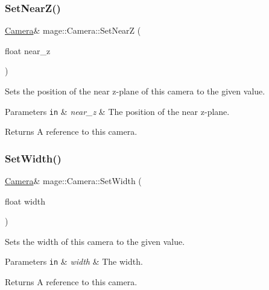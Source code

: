 \subsubsection{\texorpdfstring{Set\+Near\+Z()}{SetNearZ()}}
{\footnotesize\ttfamily \hyperlink{classmage_1_1_camera}{Camera}\& mage\+::\+Camera\+::\+Set\+NearZ (\begin{DoxyParamCaption}\item[{float}]{near\+\_\+z }\end{DoxyParamCaption})}

Sets the position of the near z-\/plane of this camera to the given value.


\begin{DoxyParams}[1]{Parameters}
\mbox{\tt in}  & {\em near\+\_\+z} & The position of the near z-\/plane. \\
\hline
\end{DoxyParams}
\begin{DoxyReturn}{Returns}
A reference to this camera. 
\end{DoxyReturn}
\hypertarget{classmage_1_1_camera_acddfb1108ee8f7e937833286c082dadf}{}\label{classmage_1_1_camera_acddfb1108ee8f7e937833286c082dadf} 
\subsubsection{\texorpdfstring{Set\+Width()}{SetWidth()}}
{\footnotesize\ttfamily \hyperlink{classmage_1_1_camera}{Camera}\& mage\+::\+Camera\+::\+Set\+Width (\begin{DoxyParamCaption}\item[{float}]{width }\end{DoxyParamCaption})}

Sets the width of this camera to the given value.


\begin{DoxyParams}[1]{Parameters}
\mbox{\tt in}  & {\em width} & The width. \\
\hline
\end{DoxyParams}
\begin{DoxyReturn}{Returns}
A reference to this camera. 
\end{DoxyReturn}
\hypertarget{classmage_1_1_camera_a275b6908662c0cde4fec5485ff04a846}{}\label{classmage_1_1_camera_a275b6908662c0cde4fec5485ff04a846} 
